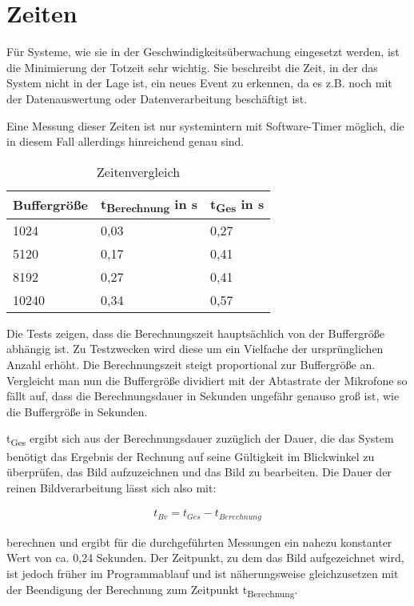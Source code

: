 \section{Zeiten}

Für Systeme, wie sie in der Geschwindigkeitsüberwachung eingesetzt werden, ist die Minimierung der Totzeit sehr wichtig. Sie beschreibt die Zeit, in der das System nicht in der Lage ist, ein neues Event zu erkennen, da es z.B. noch mit der Datenauswertung oder Datenverarbeitung beschäftigt ist.

Eine Messung dieser Zeiten ist nur systemintern mit Software-Timer möglich, die in diesem Fall allerdings hinreichend genau sind.

\begin{table}[h]
\centering
\begin{tabular}[h]{|l|l|l|}
	\hline
	Buffergröße & t\textsubscript{Berechnung} in s & t\textsubscript{Ges} in s \\
	\hline
	1024 & 0,03 & 0,27\\
	\hline
	5120 & 0,17 & 0,41\\
	\hline
	8192 & 0,27 & 0,41\\
	\hline
	10240 & 0,34 & 0,57\\
	\hline	
\end{tabular}
\caption{Zeitenvergleich}
\label{tab:Zeitenvergleich}
\end{table}

Die Tests zeigen, dass die Berechnungszeit hauptsächlich von der Buffergröße abhängig ist. Zu Testzwecken wird diese um ein Vielfache der ursprünglichen Anzahl erhöht. Die Berechnungszeit steigt proportional zur Buffergröße an. Vergleicht man nun die Buffergröße dividiert mit der Abtastrate der Mikrofone so fällt auf, dass die Berechnungsdauer in Sekunden ungefähr genauso groß ist, wie die Buffergröße in Sekunden. 

t\textsubscript{Ges} ergibt sich aus der Berechnungsdauer zuzüglich der Dauer, die das System benötigt das Ergebnis der Rechnung auf seine Gültigkeit im Blickwinkel zu überprüfen, das Bild aufzuzeichnen und das Bild zu bearbeiten. Die Dauer der reinen Bildverarbeitung lässt sich also mit:

\begin{equation}
	\begin{aligned}
		t_{Bv} = t_{Ges} - t_{Berechnung}
	\end{aligned}
	\nonumber
\end{equation}

berechnen und ergibt für die durchgeführten Messungen ein nahezu konstanter Wert von ca. 0,24 Sekunden. Der Zeitpunkt, zu dem das Bild aufgezeichnet wird, ist jedoch früher im Programmablauf und ist näherungsweise gleichzusetzen mit der Beendigung der Berechnung zum Zeitpunkt t\textsubscript{Berechnung}. 

\newpage